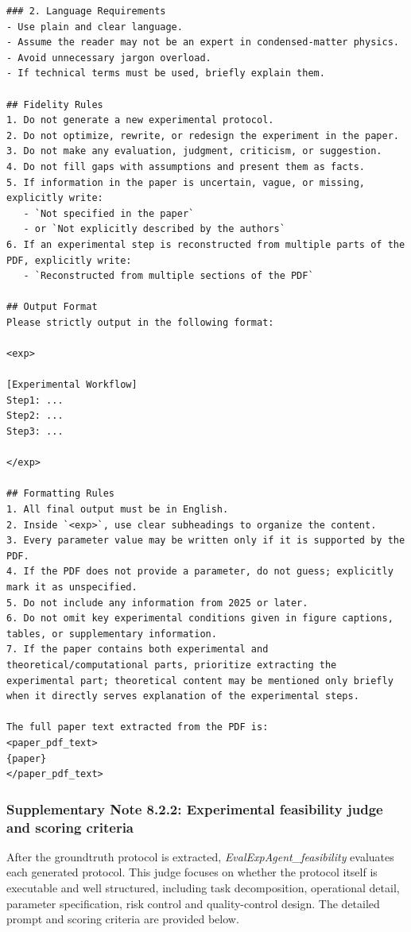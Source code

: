 \begin{lstlisting}[style=jsonstyle]
### 2. Language Requirements
- Use plain and clear language.
- Assume the reader may not be an expert in condensed-matter physics.
- Avoid unnecessary jargon overload.
- If technical terms must be used, briefly explain them.

## Fidelity Rules
1. Do not generate a new experimental protocol.
2. Do not optimize, rewrite, or redesign the experiment in the paper.
3. Do not make any evaluation, judgment, criticism, or suggestion.
4. Do not fill gaps with assumptions and present them as facts.
5. If information in the paper is uncertain, vague, or missing, explicitly write:
   - `Not specified in the paper`
   - or `Not explicitly described by the authors`
6. If an experimental step is reconstructed from multiple parts of the PDF, explicitly write:
   - `Reconstructed from multiple sections of the PDF`

## Output Format
Please strictly output in the following format:

<exp>

[Experimental Workflow]
Step1: ...
Step2: ...
Step3: ...

</exp>

## Formatting Rules
1. All final output must be in English.
2. Inside `<exp>`, use clear subheadings to organize the content.
3. Every parameter value may be written only if it is supported by the PDF.
4. If the PDF does not provide a parameter, do not guess; explicitly mark it as unspecified.
5. Do not include any information from 2025 or later.
6. Do not omit key experimental conditions given in figure captions, tables, or supplementary information.
7. If the paper contains both experimental and theoretical/computational parts, prioritize extracting the experimental part; theoretical content may be mentioned only briefly when it directly serves explanation of the experimental steps.

The full paper text extracted from the PDF is:
<paper_pdf_text>
{paper}
</paper_pdf_text>
\end{lstlisting}

\subsubsection*{Supplementary Note 8.2.2: Experimental feasibility judge and scoring criteria}
{}
After the groundtruth protocol is extracted, \textit{EvalExpAgent\_feasibility} evaluates each generated protocol. This judge focuses on whether the protocol itself is executable and well structured, including task decomposition, operational detail, parameter specification, risk control and quality-control design. The detailed prompt and scoring criteria are provided below.

